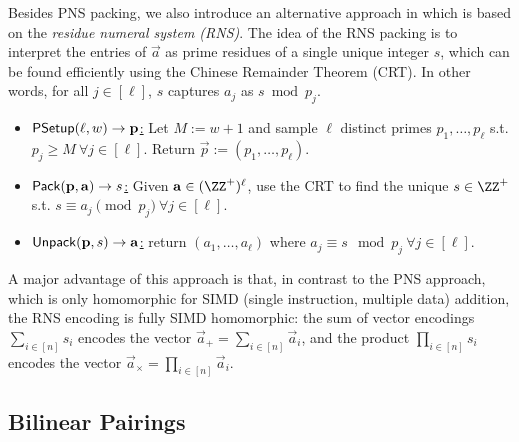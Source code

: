Besides PNS packing, we also introduce an alternative approach in  which is based on the \emph{residue numeral system (RNS)}. The idea of the RNS packing is to interpret the entries of $\vec{a}$ as prime residues of a single unique integer $s$, which can be found efficiently using the Chinese Remainder Theorem (CRT). In other words, for all $j \in [\ell]$, $s$ captures $a_j$ as $s \bmod p_j$.

\begin{construction}\label{con:packingRNS}
\hfill
\begin{itemize}%
    \item \underline{$\mathsf{PSetup}(\ell, w) \to \mathbf{p}$:} Let $M := w + 1$ and sample $\ell$ distinct primes $p_1, \dots, p_\ell$ s.t. $p_j \geq M\ \forall j \in [\ell]$. Return $\vec{p} := (p_1, \dots, p_\ell)$.
    \item \underline{$\pack(\vec{p}, \Vec{a}) \to s$:} Given $\Vec{a} \in (\ZZ^+)^\ell$, use the CRT to find the unique $s \in \ZZ^+$ s.t. $s\equiv a_j \pmod{p_j}~\forall j\in[\ell]$.
    \item \underline{$\unpack(\vec{p}, s) \to \Vec{a}$:} return $(a_1, \dots, a_\ell)$ where $a_j \equiv s \mod{p_j}\ \forall j \in [\ell]$.
\end{itemize}
\end{construction}

A major advantage of this approach is that, in contrast to the PNS approach, which is only homomorphic for SIMD (single instruction, multiple data) addition, the RNS encoding is fully SIMD homomorphic: the sum of vector encodings $\sum_{i \in [n]} s_i$ encodes the vector $\vec{a}_{+} = \sum_{i \in [n]} \vec{a}_i$, and the product $\prod_{i \in [n]} s_i$ encodes the vector $\vec{a}_{\times} = \prod_{i \in [n]} \vec{a}_i$. 

\subsection{Bilinear Pairings}\label{sec:pairings}

